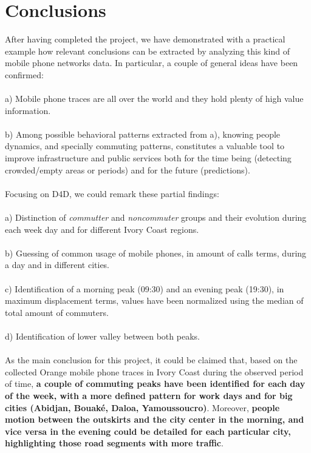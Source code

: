 \newpage
\section{Conclusions}

After having completed the project, we have demonstrated with a practical example how relevant conclusions can be extracted by analyzing this kind of mobile phone networks data. In particular, a couple of general ideas have been confirmed:
\\
\\
a) Mobile phone traces are all over the world and they hold plenty of high value information.
\\
\\
b) Among possible behavioral patterns extracted from a), knowing people dynamics, and specially commuting patterns, constitutes a valuable tool to improve infrastructure and public services both for the time being (detecting crowded/empty areas or periods) and for the future (predictions).
\\
\\
Focusing on D4D, we could remark these partial findings:
\\
\\
a) Distinction of {\it commutter} and {\it noncommuter} groups and their evolution during each week day and for different Ivory Coast regions.
\\
\\
b) Guessing of common usage of mobile phones, in amount of calls terms, during a day and in different cities.
\\
\\
c) Identification of a morning peak (09:30) and an evening peak (19:30), in maximum displacement terms, values have been normalized using the median of total amount of commuters.
\\
\\
d) Identification of lower valley between both peaks.
\\
\\
As the main conclusion for this project, it could be claimed that, based on the collected Orange mobile phone traces in Ivory Coast during the observed period of time, {\bf a couple of commuting peaks have been identified for each day of the week, with a more defined pattern for work days and for big cities (Abidjan, Bouaké, Daloa, Yamoussoucro)}. Moreover, {\bf people motion between the outskirts and the city center in the morning, and vice versa in the evening could be detailed for each particular city, highlighting those road segments with more traffic}.

